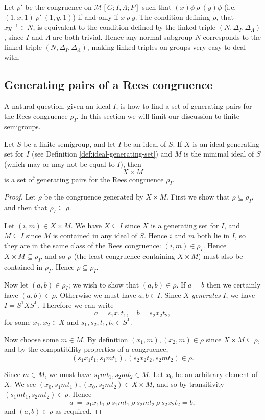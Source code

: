 Let $\rho'$ be the congruence on $\mathcal{M}[G; I, \Lambda; P]$ such that
$(x)\phi ~\rho~ (y)\phi$ (i.e.~$(1,x,1) ~\rho'~ (1,y,1)$) if and only if
$x ~\rho~ y$.  The condition defining $\rho$, that $xy^{-1} \in N$, is
equivalent to the condition defined by the linked triple
$(N, \Delta_I, \Delta_\Lambda)$, since $I$ and $\Lambda$ are both trivial.
Hence any normal subgroup $N$ corresponds to the linked triple
$(N, \Delta_I, \Delta_\Lambda)$, making linked triples on groups very easy to
deal with.

\subsection{Generating pairs of a Rees congruence}
\label{sec:rees-to-pairs}
A natural question, given an ideal $I$, is how to find a set of generating pairs
for the Rees congruence $\rho_I$.  In this section we will limit our discussion
to finite semigroups.

\begin{theorem}
  Let $S$ be a finite semigroup, and let $I$ be an ideal of $S$.  If $X$ is an ideal
  generating set for $I$ (see Definition \ref{def:ideal-generating-set}) and $M$
  is the minimal ideal of $S$ (which may or may not be equal to $I$), then
  $$X \times M$$ is a set of generating pairs for the Rees congruence $\rho_I$.
  \begin{proof}
    Let $\rho$ be the congruence generated by $X \times M$.  First we show that
    $\rho \subseteq \rho_I$, and then that $\rho_I \subseteq \rho$.

    Let $(i,m) \in X \times M$.  We have $X \subseteq I$ since $X$ is a
    generating set for $I$, and $M \subseteq I$ since $M$ is contained in any
    ideal of $S$.  Hence $i$ and $m$ both lie in $I$, so they are in the same
    class of the Rees congruence: $(i,m) \in \rho_I$.  Hence $X \times M
    \subseteq \rho_I$, and so $\rho$ (the least congruence containing $X \times
    M$) must also be contained in $\rho_I$.  Hence $\rho \subseteq \rho_I$.

    Now let $(a,b) \in \rho_I$; we wish to show that $(a,b) \in \rho$.  If $a=b$
    then we certainly have $(a,b) \in \rho$.  Otherwise we must have $a,b \in
    I$.  Since $X$ \textit{generates} $I$, we have $I = S^1XS^1$.  Therefore we
    can write
    $$a = s_1x_1t_1, \quad b = s_2x_2t_2,$$
    for some $x_1,x_2 \in X$ and $s_1,s_2,t_1,t_2 \in S^1$.

    Now choose some $m \in M$.  By definition $(x_1,m), (x_2,m) \in \rho$ since
    $X \times M \subseteq \rho$, and
    by the compatibility properties of a congruence,
    $$(s_1x_1t_1,s_1mt_1), (s_2x_2t_2,s_2mt_2) \in \rho.$$

    Since $m \in M$, we must have $s_1mt_1,s_2mt_2 \in M$.  Let $x_0$ be an
    arbitrary element of $X$.
    We see $(x_0,s_1mt_1), (x_0,s_2mt_2) \in X \times M$, and so by transitivity
    $(s_1mt_1, s_2mt_2) \in \rho$.
    Hence
    $$a ~=~ s_1x_1t_1 ~\rho~ s_1mt_1 ~\rho~ s_2mt_2 ~\rho~ s_2x_2t_2 = b,$$
    and $(a,b) \in \rho$ as required.
  \end{proof}
\end{theorem}

